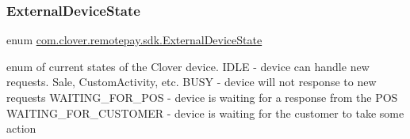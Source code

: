 \subsubsection{\texorpdfstring{External\+Device\+State}{ExternalDeviceState}}
{\footnotesize\ttfamily enum \hyperlink{namespacecom_1_1clover_1_1remotepay_1_1sdk_a9d5838a91e2711306ad561d104fed034}{com.\+clover.\+remotepay.\+sdk.\+External\+Device\+State}\hspace{0.3cm}{\ttfamily [strong]}}



enum of current states of the Clover device. I\+D\+LE -\/ device can handle new requests. Sale, Custom\+Activity, etc. B\+U\+SY -\/ device will not response to new requests W\+A\+I\+T\+I\+N\+G\+\_\+\+F\+O\+R\+\_\+\+P\+OS -\/ device is waiting for a response from the P\+OS W\+A\+I\+T\+I\+N\+G\+\_\+\+F\+O\+R\+\_\+\+C\+U\+S\+T\+O\+M\+ER -\/ device is waiting for the customer to take some action 

